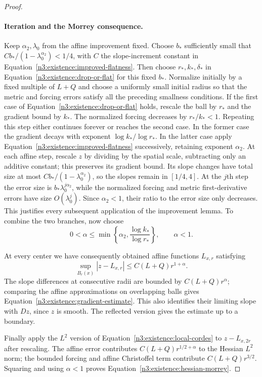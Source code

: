 \begin{proof}
\paragraph{Iteration and the Morrey consequence.}
Keep $\alpha_2,\lambda_0$ from the affine improvement fixed.  Choose
$b_*$ sufficiently small that
$Cb_*/(1-\lambda_0^{\alpha_2})<1/4$, with $C$ the slope-increment
constant in Equation~\eqref{n3:existence:improved-flatness}.
Then choose $r_*,k_*,\delta_*$ in
Equation~\eqref{n3:existence:drop-or-flat} for this fixed $b_*$.
Normalize initially by a fixed multiple of $L+Q$ and choose a
uniformly small initial radius so that the metric and forcing errors
satisfy all the preceding smallness conditions.  If the first case
of Equation~\eqref{n3:existence:drop-or-flat} holds, rescale the ball
by $r_*$ and the gradient bound by $k_*$.  The normalized forcing
decreases by $r_*/k_*<1$.  Repeating this step either continues
forever or reaches the second case.  In the former case the gradient
decays with exponent $\log k_*/\log r_*$.
In the latter case apply Equation~\eqref{n3:existence:improved-flatness}
successively, retaining exponent $\alpha_2$.  At each affine step,
rescale $z$ by dividing by the spatial scale, subtracting only an
additive constant; this preserves its gradient bound.
Its slope changes have total size at most
$Cb_*/(1-\lambda_0^{\alpha_2})$, so the slopes remain in $[1/4,4]$.
At the $j$th step the error size is $b_*\lambda_0^{j\alpha_2}$,
while the normalized forcing and metric first-derivative errors have
size $O(\lambda_0^j)$.  Since $\alpha_2<1$, their ratio to the error
size only decreases.  This justifies every subsequent application
of the improvement lemma.  To combine the two branches, now choose
\begin{equation}\label{n3:existence:iteration-exponent}
 0<\alpha\le\min\left\{\alpha_2,
              \frac{\log k_*}{\log r_*}\right\},\qquad \alpha<1.
\end{equation}

At every center we have consequently obtained affine functions
$L_{x,r}$ satisfying
\begin{equation}\label{n3:existence:campanato-affine}
 \sup_{B_r(x)}|z-L_{x,r}|
 \le C(L+Q)r^{1+\alpha}.
\end{equation}
The slope differences at consecutive radii are bounded by
$C(L+Q)r^\alpha$; comparing the affine approximations on
overlapping balls gives Equation~\eqref{n3:existence:gradient-estimate}.
This also identifies their limiting slope with $Dz$, since $z$ is
smooth.  The reflected version gives the estimate up to a boundary.

Finally apply the $L^2$ version of
Equation~\eqref{n3:existence:local-cordes} to $z-L_{x,2r}$ after
rescaling.  The affine error contributes
$C(L+Q)r^{1/2+\alpha}$ to the Hessian $L^2$ norm; the bounded
forcing and affine Christoffel term contribute $C(L+Q)r^{3/2}$.
Squaring and using $\alpha<1$ proves
Equation~\eqref{n3:existence:hessian-morrey}.
\end{proof}

